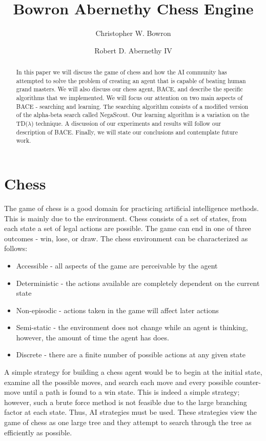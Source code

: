 \documentclass{article}
\author{Christopher W. Bowron \and Robert D. Abernethy IV}
\title{Bowron Abernethy Chess Engine}
\begin{document}
\maketitle

\begin{abstract}
In this paper we will discuss the game of chess and how the AI
community has attempted to solve the problem of creating an agent that
is capable of beating human grand masters.  We will also discuss our
chess agent, BACE, and describe the specific algorithms that we
implemented.  We will focus our attention on two main aspects of BACE
- searching and learning.  The searching algorithm consists of a
modified version of the alpha-beta search called NegaScout.
Our learning algorithm is a variation on the TD($\lambda$) technique.  A
discussion of our experiments and results will follow our description
of BACE.  Finally, we will state our conclusions and contemplate
future work. 

\end{abstract}

\section{Chess}
The game of chess is a good domain for practicing artificial
intelligence methods.  This is
mainly due to the environment.  Chess
consists of a set of states, from each state a set of legal actions
are possible.  The game can end in one of three outcomes - win, lose,
or draw.  The chess environment can be characterized as follows:

\begin{itemize}
\item Accessible - all aspects of the game are perceivable by the agent
\item Deterministic - the actions available are completely dependent on the current state
\item Non-episodic - actions taken in the game will affect later actions
\item Semi-static - the environment does not change while an agent is
thinking, however, the amount of time the agent has does.
\item Discrete - there are a finite number of possible actions at any given state
\end{itemize}

A simple strategy for building a chess agent would be to begin at the
initial state, examine all the possible moves, and search each move and
every possible counter-move until a path is found to a win state.
This is indeed a simple strategy; however, such a brute force method
is not feasible due to the large branching factor at each state.
Thus, AI strategies must be used. These strategies view the game of
chess as one large tree and they attempt to search through the tree as
efficiently as possible. 
\end{document}
